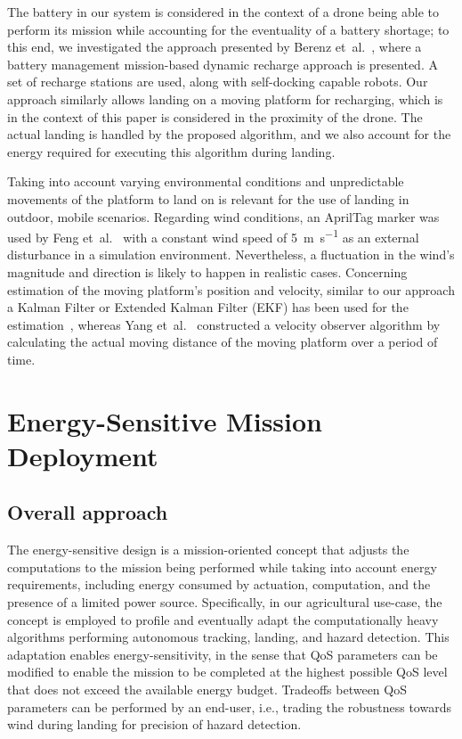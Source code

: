 \documentclass[conference, onecolumn, draftclsnofoot]{IEEEtran}
\begin{document}
The battery in our system is considered in the context of a drone
being able to perform its mission while accounting for the eventuality
of a battery shortage; to this end, we investigated the approach
presented by Berenz et~al.~\cite{berenz2012autonomous}, where a
battery management mission-based dynamic recharge approach is
presented. A set of recharge stations are used, along with
self-docking capable robots. Our approach similarly allows landing on
a moving platform for recharging, which is in the context of this
paper is considered in the proximity of the drone. The actual landing
is handled by the proposed algorithm, and we also account for the
energy required for executing this algorithm during landing.
%

Taking into account varying environmental conditions and unpredictable
movements of the platform to land on is relevant for the use of
landing in outdoor, mobile scenarios.  Regarding wind conditions, an
AprilTag marker was used by Feng et~al.~\cite{feng2018autonomous} with
a constant wind speed of \SI{5}{\m \per \s} as an external disturbance in a
simulation environment. Nevertheless, a fluctuation in the wind's
magnitude and direction is likely to happen in realistic cases.
Concerning estimation of the moving platform's position and velocity,
similar to our approach a Kalman Filter or Extended Kalman Filter (EKF) has been used for the
estimation~\cite{araar2017vision,feng2018autonomous,
  falanga2017vision}, whereas Yang et~al.~\cite{yang2018hybrid}
constructed a velocity observer algorithm by calculating the actual
moving distance of the moving platform over a period of time.



\section{Energy-Sensitive Mission Deployment} 
\label{sec:approach}

\subsection{Overall approach}

The energy-sensitive design is a mission-oriented concept that adjusts
the computations to the mission being performed while taking into
account energy requirements, including energy consumed by actuation,
computation, and the presence of a limited power source. Specifically,
in our agricultural use-case, the concept is employed to profile and eventually adapt the
computationally heavy algorithms performing autonomous tracking,
landing, and hazard detection. This adaptation enables
energy-sensitivity, in the sense that QoS parameters can be modified
to enable the mission to be completed at the highest possible QoS
level that does not exceed the available energy budget. Tradeoffs
between QoS parameters can be performed by an end-user, i.e., trading
the robustness towards wind during landing for precision of hazard
detection.
\end{document}
